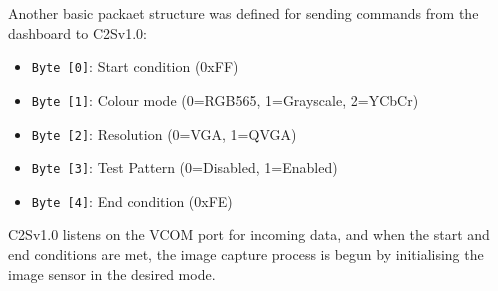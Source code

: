 Another basic packaet structure was defined for sending commands from the dashboard to C2Sv1.0:

\begin{itemize}
    \item \verb|Byte [0]|: Start condition (0xFF)
    \item \verb|Byte [1]|: Colour mode (0=RGB565, 1=Grayscale, 2=YCbCr)
    \item \verb|Byte [2]|: Resolution (0=VGA, 1=QVGA)
    \item \verb|Byte [3]|: Test Pattern (0=Disabled, 1=Enabled)
    \item \verb|Byte [4]|: End condition (0xFE)
\end{itemize}

C2Sv1.0 listens on the VCOM port for incoming data, and when the start and end conditions are met, the image capture process is begun by initialising the image sensor in the desired mode.